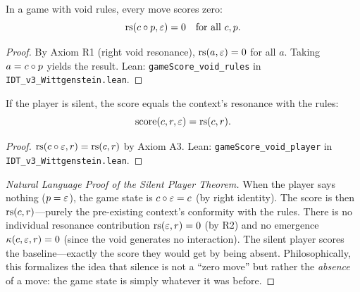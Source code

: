 \begin{theorem}
\label{thm:void-rules}
In a game with void rules, every move scores zero:
\[
\mathrm{rs}(c \circ p, \varepsilon) = 0 \quad \text{for all } c, p.
\]
\end{theorem}

\begin{proof}
By Axiom R1 (right void resonance), $\mathrm{rs}(a, \varepsilon) = 0$ for all $a$.
Taking $a = c \circ p$ yields the result.
Lean: \texttt{gameScore\_void\_rules} in \texttt{IDT\_v3\_Wittgenstein.lean}.
\end{proof}

\begin{theorem}
\label{thm:silent-player}
If the player is silent, the score equals the context's resonance with the rules:
\[
\mathrm{score}(c, r, \varepsilon) = \mathrm{rs}(c, r).
\]
\end{theorem}

\begin{proof}
$\mathrm{rs}(c \circ \varepsilon, r) = \mathrm{rs}(c, r)$ by Axiom A3.
Lean: \texttt{gameScore\_void\_player} in \texttt{IDT\_v3\_Wittgenstein.lean}.
\end{proof}

\begin{proof}[Natural Language Proof of the Silent Player Theorem]
When the player says nothing ($p = \varepsilon$), the game state is $c \circ \varepsilon = c$
(by right identity). The score is then $\mathrm{rs}(c, r)$---purely the pre-existing
context's conformity with the rules. There is no individual resonance contribution
$\mathrm{rs}(\varepsilon, r) = 0$ (by R2) and no emergence $\kappa(c, \varepsilon, r) = 0$
(since the void generates no interaction). The silent player scores the
baseline---exactly the score they would get by being absent. Philosophically,
this formalizes the idea that silence is not a ``zero move'' but rather the
\emph{absence} of a move: the game state is simply whatever it was before.
\end{proof}

